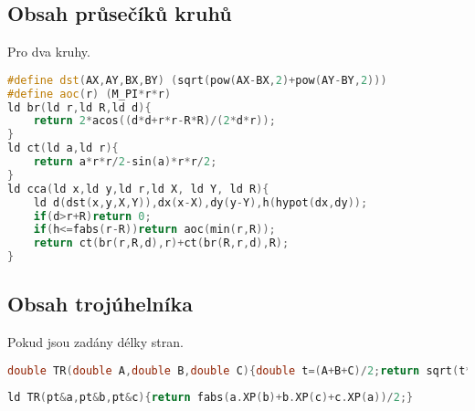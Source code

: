 \documentclass[11pt]{article}
\begin{document}
\subsection{Obsah průsečíků kruhů}
\begin{center}
Pro dva kruhy.
\end{center}
\begin{lstlisting}[language=C++]
#define dst(AX,AY,BX,BY) (sqrt(pow(AX-BX,2)+pow(AY-BY,2)))
#define aoc(r) (M_PI*r*r)
ld br(ld r,ld R,ld d){
    return 2*acos((d*d+r*r-R*R)/(2*d*r));
}
ld ct(ld a,ld r){
    return a*r*r/2-sin(a)*r*r/2;
}
ld cca(ld x,ld y,ld r,ld X, ld Y, ld R){
    ld d(dst(x,y,X,Y)),dx(x-X),dy(y-Y),h(hypot(dx,dy));
    if(d>r+R)return 0;
    if(h<=fabs(r-R))return aoc(min(r,R));
    return ct(br(r,R,d),r)+ct(br(R,r,d),R);
}
\end{lstlisting}
\subsection{Obsah trojúhelníka}
Pokud jsou zadány délky stran.
\begin{lstlisting}[language=C++]
double TR(double A,double B,double C){double t=(A+B+C)/2;return sqrt(t*(t-A)*(t-B)*(t-C));}
\end{lstlisting}
\begin{lstlisting}[language=C++]
ld TR(pt&a,pt&b,pt&c){return fabs(a.XP(b)+b.XP(c)+c.XP(a))/2;}
\end{lstlisting}
\end{document}
